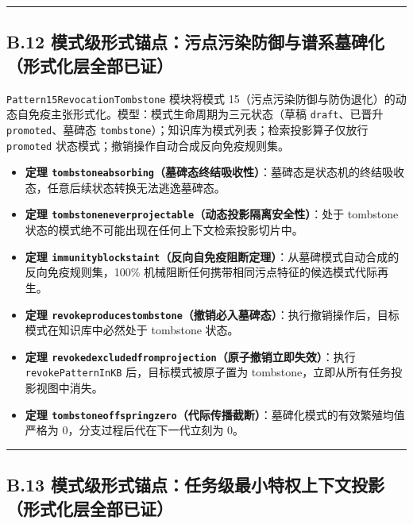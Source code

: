 \documentclass[
]{ctexart}
\providecommand{\tightlist}{%
  \setlength{\itemsep}{0pt}\setlength{\parskip}{0pt}}
\renewcommand{\_}{\discretionary{}{}{\textunderscore}}
\begin{document}
\begin{center}\rule{0.5\linewidth}{0.5pt}\end{center}

\subsection{B.12
模式级形式锚点：污点污染防御与谱系墓碑化（形式化层全部已证）}\label{b.12-ux6a21ux5f0fux7ea7ux5f62ux5f0fux951aux70b9ux6c61ux70b9ux6c61ux67d3ux9632ux5fa1ux4e0eux8c31ux7cfbux5893ux7891ux5316ux5f62ux5f0fux5316ux5c42ux5168ux90e8ux5df2ux8bc1}

\texttt{Pattern15\_RevocationTombstone} 模块将模式
15（污点污染防御与防伪退化）的动态自免疫主张形式化。模型：模式生命周期为三元状态（草稿
\texttt{draft}、已晋升 \texttt{promoted}、墓碑态
\texttt{tombstone}）；知识库为模式列表；检索投影算子仅放行
\texttt{promoted} 状态模式；撤销操作自动合成反向免疫规则集。

\begin{itemize}
\tightlist
\item
  \textbf{定理
  \texttt{tombstone\_absorbing}（墓碑态终结吸收性）}：墓碑态是状态机的终结吸收态，任意后续状态转换无法逃逸墓碑态。
\item
  \textbf{定理
  \texttt{tombstone\_never\_projectable}（动态投影隔离安全性）}：处于
  tombstone 状态的模式绝不可能出现在任何上下文检索投影切片中。
\item
  \textbf{定理
  \texttt{immunity\_blocks\_taint}（反向自免疫阻断定理）}：从墓碑模式自动合成的反向免疫规则集，100\%
  机械阻断任何携带相同污点特征的候选模式代际再生。
\item
  \textbf{定理
  \texttt{revoke\_produces\_tombstone}（撤销必入墓碑态）}：执行撤销操作后，目标模式在知识库中必然处于
  tombstone 状态。
\item
  \textbf{定理
  \texttt{revoked\_excluded\_from\_projection}（原子撤销立即失效）}：执行
  \texttt{revokePatternInKB} 后，目标模式被原子置为
  tombstone，立即从所有任务投影视图中消失。
\item
  \textbf{定理
  \texttt{tombstone\_offspring\_zero}（代际传播截断）}：墓碑化模式的有效繁殖均值严格为
  0，分支过程后代在下一代立刻为 0。
\end{itemize}

\begin{center}\rule{0.5\linewidth}{0.5pt}\end{center}

\subsection{B.13
模式级形式锚点：任务级最小特权上下文投影（形式化层全部已证）}\label{b.13-ux6a21ux5f0fux7ea7ux5f62ux5f0fux951aux70b9ux4efbux52a1ux7ea7ux6700ux5c0fux7279ux6743ux4e0aux4e0bux6587ux6295ux5f71ux5f62ux5f0fux5316ux5c42ux5168ux90e8ux5df2ux8bc1}
\end{document}
